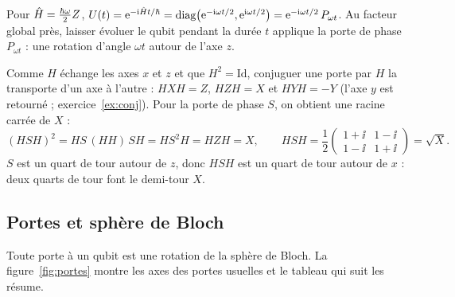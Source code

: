 \begin{remarque}
Pour $\hat{H}=\frac{\hbar\omega}{2}Z$, $U(t)=\mathrm{e}^{-\mathrm{i}\hat{H} t/\hbar}=\mathrm{diag}\big(\mathrm{e}^{-\mathrm{i}\omega t/2},\mathrm{e}^{\mathrm{i}\omega t/2}\big)
=\mathrm{e}^{-\mathrm{i}\omega t/2}\,P_{\omega t}$. Au facteur global près, laisser évoluer le qubit pendant la
durée $t$ applique la porte de phase $P_{\omega t}$ : une rotation d'angle $\omega t$ autour de
l'axe $z$.
\end{remarque}

\begin{remarque}[Conjuguer par $H$ : $HXH=Z$, $HYH=-Y$ et $HSH=\sqrt{X}$]\label{rem:conjH}
Comme $H$ échange les axes $x$ et $z$ et que $H^2=\mathrm{Id}$, conjuguer une porte par $H$ la
transporte d'un axe à l'autre : $HXH=Z$, $HZH=X$ et $HYH=-Y$ (l'axe $y$ est retourné ;
exercice~\ref{ex:conj}). Pour la porte de phase $S$, on obtient une racine carrée de $X$ :
\[
  (HSH)^2=HS\,(HH)\,SH=HS^2H=HZH=X,
  \qquad
  HSH=\frac12\begin{pmatrix}1+\ii&1-\ii\\1-\ii&1+\ii\end{pmatrix}=\sqrt{X}.
\]
$S$ est un quart de tour autour de $z$, donc $HSH$ est un quart de tour autour de $x$ : deux
quarts de tour font le demi-tour $X$.
\end{remarque}

\subsection{Portes et sphère de Bloch}\label{sec:portes-bloch}

Toute porte à un qubit est une rotation de la sphère de Bloch. La figure~\ref{fig:portes} montre
les axes des portes usuelles et le tableau qui suit les résume.

